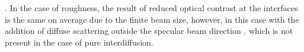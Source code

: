 \cite{braun_grenzflachen-optimierte_2003,braun_mo/si_2002}. In the case of roughness, the result of reduced optical contrast at the interfaces is the same on average due to the finite beam size, however, in this case with the addition of diffuse scattering outside the specular beam direction \cite{sinha_x-ray_1994}, which is not present in the case of pure interdiffusion.
% 
